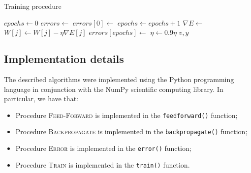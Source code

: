 \documentclass[letterpaper,headings=standardclasses]{scrartcl}
\begin{document}
\begin{algorithm}[h]
    \caption{Training procedure}
    \label{tralg}
    \begin{algorithmic}
    
        \State {}
        \State $epochs \gets 0$
        \State $errors \gets $ 
        \State $errors[0] \gets $ 
        \State {}
            \State $epochs \gets epochs + 1$
            \State {}
                \State $\nabla E \gets $ 
                    \State $W[j] \gets W[j] - \eta \nabla E[j]$
                \EndFor
            \EndFor
            \State {}
            \State $errors[epochs] \gets $ 
            \State {}
                \State $\eta \gets 0.9 \eta$
            \EndIf
        \EndWhile
        \State \Return $v, y$
    \EndFunction
    
    \end{algorithmic}
\end{algorithm}

\subsection{Implementation details}

The described algorithms were implemented using the Python programming language in conjunction with the NumPy scientific computing library. In particular, we have that:

\begin{itemize}
    \item Procedure \textsc{Feed-Forward} is implemented in the \texttt{feedforward()} function;
    \item Procedure \textsc{Backpropagate} is implemented in the \texttt{backpropagate()} function;
    \item Procedure \textsc{Error} is implemented in the \texttt{error()} function;
    \item Procedure \textsc{Train} is implemented in the \texttt{train()} function.
\end{itemize}
\end{document}
